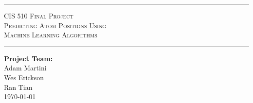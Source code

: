 \begin{titlepage}
\begin{center}

\rule{\linewidth}{0.5mm}

\textsc{\large CIS 510 Final Project}
~\\[.7cm]

{\Huge
	\textsc{Predicting Atom Positions Using \\\vspace{.5em} Machine Learning Algorithms}
}

\vspace{12pt}

\rule{\linewidth}{0.5mm}

\vfill

\textbf{Project Team:}\\
Adam Martini\\
Wes Erickson\\
Ran Tian\\

\vfill
{\large \today}

\end{center}
\end{titlepage}